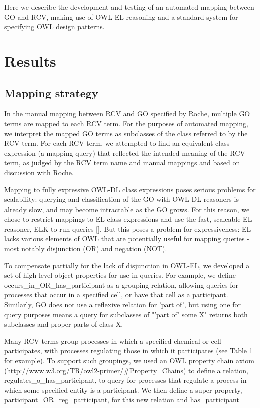 \documentclass[runningheads,a4paper]{llncs}
\begin{document}
{Here we describe the development and testing of an automated mapping between GO and RCV, making use of OWL-EL reasoning and a standard system for specifying OWL design patterns.

\section{Results}

\subsection{Mapping strategy}

In the manual mapping between RCV and GO specified by Roche, multiple GO terms are mapped to each RCV term. For the purposes of automated mapping, we interpret the mapped GO terms as subclasses of the class referred to by the RCV term. For each RCV term, we attempted to find an equivalent class expression (a mapping query) that reflected the intended meaning of the RCV term, as judged by the RCV term name and manual mappings and based on discussion with Roche.

Mapping to fully expressive OWL-DL class expressions poses serious problems for scalability: querying and classification of the GO with OWL-DL reasoners is already slow, and may become intractable as the GO grows.  For this reason, we chose to restrict mappings to EL class expressions and use the fast, scaleable EL reasoner, ELK to run queries []. But this poses a problem for expressiveness: EL lacks various elements of OWL that are potentially useful for mapping queries - most notably disjunction (OR) and negation (NOT).  

To compensate partially for the lack of disjunction in OWL-EL, we developed a set of high level object properties for use in queries. For example, we define occurs_in_OR_has_participant as a grouping relation, allowing queries for processes that occur in a specified cell, or have that cell as a participant. Similarly, GO does not use a reflexive relation for 'part of', but using one for query purposes means a query for subclasses of  "'part of' some X" returns both subclasses and proper parts of class X.

Many RCV terms group processes in which a specified chemical or cell participates, with processes regulating those in which it participates (see Table 1 for example). To support such groupings, we used an OWL property chain axiom (http://www.w3.org/TR/owl2-primer/#Property_Chains) to define a relation, regulates_o_has_participant, to query for processes that regulate a process in which some specified entity is a participant. We then define a super-property, participant_OR_reg_participant, for this new relation and has_participant



}
\end{document}
